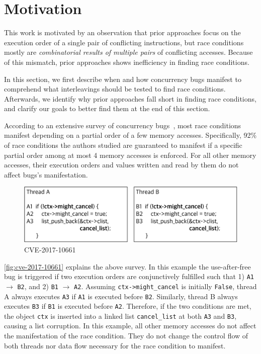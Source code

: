 \section{Motivation}
\label{ss:motivation}

This work is motivated by an observation that prior approaches
focus on the execution order of a single pair of conflicting
instructions, but race conditions mostly are \textit{combinatorial results of multiple pairs}
of conflicting accesses.
%
Because of this mismatch, prior approaches shows
inefficiency in finding race conditions.

In this section, we first describe when and how concurrency bugs
manifest to comprehend what interleavings should be tested to find
race conditions.
%
Afterwards, we identify why prior approaches fall short in finding
race conditions, and clarify our goals to better find them at the end
of this section.




%
According to an extensive survey of concurrency
bugs~\cite{learningfrommistakes}, most race conditions manifest
depending on a partial order of a few memory accesses.
%
Specifically, 92\% of race conditions the authors studied are
guaranteed to manifest if a specific partial order among at most 4
memory accesses is enforced.
%
For all other memory accesses, their execution orders and values
written and read by them do not affect bugs's manifestation.

\begin{figure}
  \centering
  \includegraphics[width=0.9\linewidth]{fig/cve-2017-10661.pdf}
  \caption{CVE-2017-10661}
  \label{fig:cve-2017-10661}
\end{figure}

\autoref{fig:cve-2017-10661} explains the above survey. In this
example the use-after-free bug is triggered if two execution orders
are conjunctively fulfilled such that 1) \texttt{A1} $\rightarrow$
\texttt{B2}, and 2) \texttt{B1} $\rightarrow$ \texttt{A2}.
%
Assuming \texttt{ctx->might_cancel} is initially \texttt{False},
thread A always executes \texttt{A3} if \texttt{A1} is executed before
\texttt{B2}. Similarly, thread B always executes \texttt{B3} if
\texttt{B1} is executed before \texttt{A2}. Therefore, if the two
conditions are met, the object \texttt{ctx} is inserted into a linked
list \texttt{cancel_list} at both \texttt{A3} and \texttt{B3}, causing
a list corruption.
%
In this example, all other memory accesses do not affect the
manifestation of the race condition. They do not change the control
flow of both threads nor data flow necessary for the race condition to
manifest.

